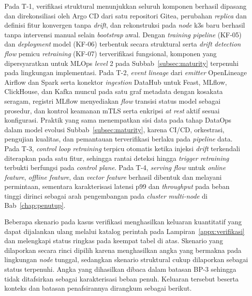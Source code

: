 Pada T-1, verifikasi struktural menunjukkan seluruh komponen berhasil dipasang dan direkonsiliasi oleh Argo CD dari satu repositori Gitea, perubahan \textit{replica} dan definisi fitur konvergen tanpa \textit{drift}, dan rekonstruksi pada \textit{node} k3s baru berhasil tanpa intervensi manual selain \textit{bootstrap} awal. Dengan \textit{training pipeline} (KF-05) dan \textit{deployment} model (KF-06) terbentuk secara struktural serta \textit{drift detection flow} pemicu \textit{retraining} (KF-07) terverifikasi fungsional, komponen yang dipersyaratkan untuk MLOps \textit{level} 2 pada Subbab~\ref{subsec:maturity} terpenuhi pada lingkungan implementasi. Pada T-2, \textit{event} \textit{lineage} dari \textit{emitter} OpenLineage Airflow dan Spark serta konektor \textit{ingestion} DataHub untuk Feast, MLflow, ClickHouse, dan Kafka muncul pada satu graf metadata dengan kosakata seragam, registri MLflow menyediakan \textit{flow} transisi status model sebagai prosedur, dan kontrol keamanan mTLS serta enkripsi \textit{at rest} aktif sesuai konfigurasi. Praktik yang sama menempatkan sisi data pada tahap DataOps dalam model evolusi Subbab~\ref{subsec:maturity}, karena CI/CD, orkestrasi, pengujian kualitas, dan pemantauan terverifikasi berlaku pada \textit{pipeline} data. Pada T-3, \textit{control loop} \textit{retraining} terpicu otomatis ketika injeksi \textit{drift} terkendali diterapkan pada satu fitur, sehingga rantai deteksi hingga \textit{trigger} \textit{retraining} terbukti berfungsi pada \textit{control plane}. Pada T-4, \textit{serving flow} untuk \textit{online feature}, \textit{offline feature}, dan \textit{vector feature} berhasil dibentuk dan melayani permintaan, sementara karakterisasi latensi p99 dan \textit{throughput} pada beban tinggi dirinci sebagai arah pengembangan pada \textit{cluster} \textit{multi-node} di Bab~\ref{chap:penutup}.

Beberapa skenario pada kasus verifikasi menghasilkan keluaran kuantitatif yang dapat dijalankan ulang melalui katalog perintah pada Lampiran~\ref{appx:verifikasi} dan melengkapi status ringkas pada keempat tabel di atas. Skenario yang dilaporkan secara rinci dipilih karena menghasilkan angka yang bermakna pada lingkungan \textit{node} tunggal, sedangkan skenario struktural cukup dilaporkan sebagai status terpenuhi. Angka yang dihasilkan dibaca dalam batasan BP-3 sehingga tidak ditafsirkan sebagai karakterisasi beban penuh. Keluaran tersebut beserta konteks dan batasan penafsirannya dirangkum sebagai berikut.

